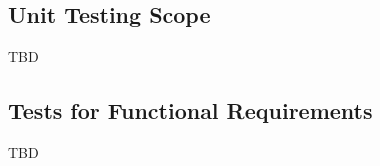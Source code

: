 \documentclass[12pt, titlepage]{article}
\begin{document}
\subsection{Unit Testing Scope}

TBD

\subsection{Tests for Functional Requirements}

TBD




					
					
					


					
\end{document}
